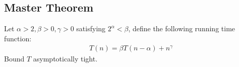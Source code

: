 %
\subsection{Master Theorem}
Let $\alpha > 2, \beta > 0, \gamma > 0$ satisfying $2^{\alpha} < \beta$, define the following running time function:
\begin{equation*}
  \begin{split}
    T(n) = \beta T(n - \alpha) + n^{\gamma}
  \end{split}
\end{equation*}
Bound $T$ asymptotically tight.

